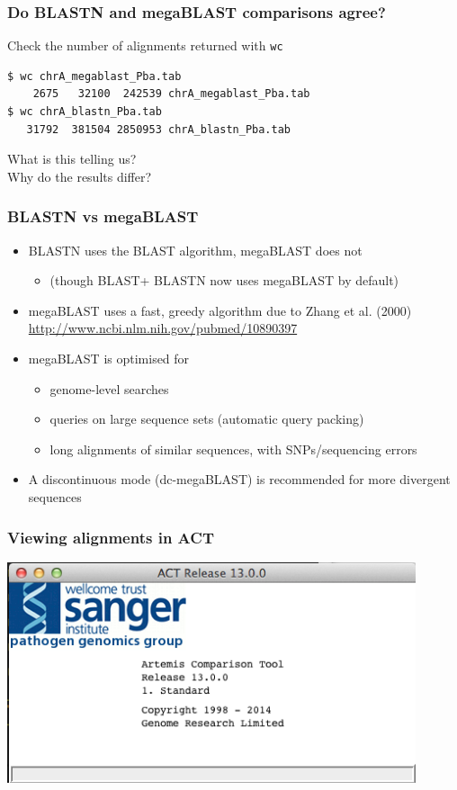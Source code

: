 \documentclass[table]{beamer}
\begin{document}
  \begin{frame}[fragile]
    \frametitle{Do BLASTN and megaBLAST comparisons agree?}
    Check the number of alignments returned with \texttt{wc}
    \begin{lstlisting}[language=bash]
$ wc chrA_megablast_Pba.tab 
    2675   32100  242539 chrA_megablast_Pba.tab
$ wc chrA_blastn_Pba.tab
   31792  381504 2850953 chrA_blastn_Pba.tab
    \end{lstlisting}
    What is this telling us? \\
    Why do the results differ?
\end{frame}         

  \begin{frame}
    \frametitle{BLASTN vs megaBLAST}
    \begin{itemize}
      \item<1-> BLASTN uses the BLAST algorithm, megaBLAST does not
      \begin{itemize}
        \item (though BLAST+ BLASTN now uses megaBLAST by default)
      \end{itemize}      
      \item<1-> megaBLAST uses a fast, greedy algorithm due to Zhang et al. (2000) \url{http://www.ncbi.nlm.nih.gov/pubmed/10890397}
      \item<2-> megaBLAST is optimised for
      \begin{itemize}
        \item genome-level searches
        \item queries on large sequence sets (automatic query packing)
        \item long alignments of similar sequences, with SNPs/sequencing errors
      \end{itemize}
      \item<2-> A discontinuous mode (dc-megaBLAST) is recommended for more divergent sequences
    \end{itemize}
\end{frame}

    \begin{frame}
      \frametitle{Viewing alignments in ACT}    
      \begin{center}
        \includegraphics[width=0.9\textwidth]{images/act_wgs1}     
      \end{center}
    \end{frame} 
\end{document}
